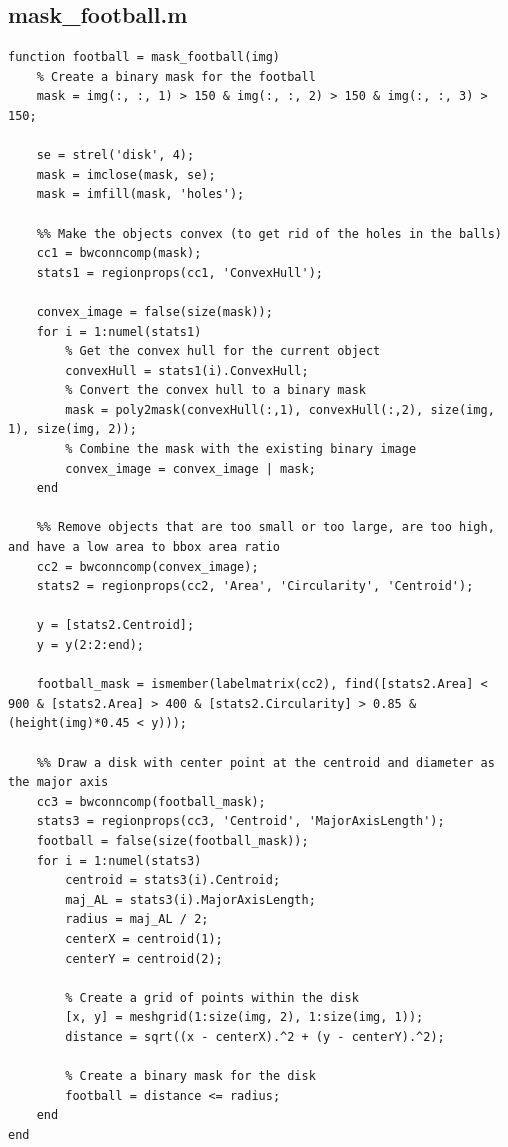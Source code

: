 \documentclass[conference]{IEEEtran}
\begin{document}
        \subsection{mask\_football.m}
            \begin{lstlisting}[style=Matlab-editor, basicstyle=\scriptsize]
function football = mask_football(img)
    % Create a binary mask for the football
    mask = img(:, :, 1) > 150 & img(:, :, 2) > 150 & img(:, :, 3) > 150;

    se = strel('disk', 4);
    mask = imclose(mask, se);
    mask = imfill(mask, 'holes');

    %% Make the objects convex (to get rid of the holes in the balls)
    cc1 = bwconncomp(mask);
    stats1 = regionprops(cc1, 'ConvexHull');

    convex_image = false(size(mask));
    for i = 1:numel(stats1)
        % Get the convex hull for the current object
        convexHull = stats1(i).ConvexHull;     
        % Convert the convex hull to a binary mask
        mask = poly2mask(convexHull(:,1), convexHull(:,2), size(img, 1), size(img, 2));
        % Combine the mask with the existing binary image
        convex_image = convex_image | mask;
    end

    %% Remove objects that are too small or too large, are too high, and have a low area to bbox area ratio
    cc2 = bwconncomp(convex_image);
    stats2 = regionprops(cc2, 'Area', 'Circularity', 'Centroid');

    y = [stats2.Centroid];
    y = y(2:2:end);

    football_mask = ismember(labelmatrix(cc2), find([stats2.Area] < 900 & [stats2.Area] > 400 & [stats2.Circularity] > 0.85 & (height(img)*0.45 < y)));

    %% Draw a disk with center point at the centroid and diameter as the major axis
    cc3 = bwconncomp(football_mask);
    stats3 = regionprops(cc3, 'Centroid', 'MajorAxisLength');
    football = false(size(football_mask));
    for i = 1:numel(stats3)
        centroid = stats3(i).Centroid;
        maj_AL = stats3(i).MajorAxisLength;
        radius = maj_AL / 2;
        centerX = centroid(1);
        centerY = centroid(2);
        
        % Create a grid of points within the disk
        [x, y] = meshgrid(1:size(img, 2), 1:size(img, 1));
        distance = sqrt((x - centerX).^2 + (y - centerY).^2);
        
        % Create a binary mask for the disk
        football = distance <= radius;     
    end
end
            \end{lstlisting}
\end{document}
